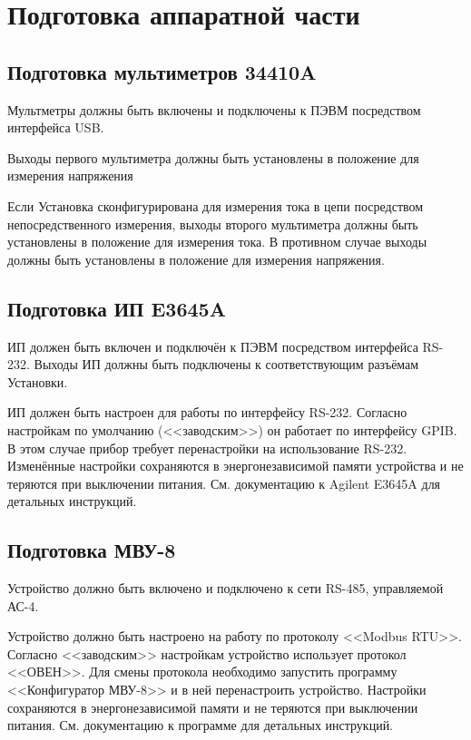\documentclass[12pt, a4paper, twocolumn]{report}
\begin{document}
\section{Подготовка аппаратной части}

\subsection{Подготовка мультиметров 34410A}

Мультметры должны быть включены и подключены к ПЭВМ посредством интерфейса USB.

Выходы первого мультиметра должны быть установлены в положение для измерения напряжения

Если Установка сконфигурирована для измерения тока в цепи посредством непосредственного измерения, выходы второго мультиметра должны быть установлены в положение для измерения тока. В противном случае выходы должны быть установлены в положение для измерения напряжения.

\subsection{Подготовка ИП E3645A}

ИП должен быть включен и подключён к ПЭВМ посредством интерфейса RS-232. Выходы ИП должны быть подключены к соответствующим разъёмам Установки.

ИП должен быть настроен для работы по интерфейсу RS-232. Согласно настройкам по умолчанию (<<заводским>>) он работает по интерфейсу GPIB. В этом случае прибор требует перенастройки на использование RS-232. Изменённые настройки сохраняются в энергонезависимой памяти устройства и не теряются при выключении питания. См. документацию к Agilent E3645A для детальных инструкций.

\subsection{Подготовка МВУ-8}

Устройство должно быть включено и подключено к сети RS-485, управляемой АС-4.

Устройство должно быть настроено на работу по протоколу <<Modbus RTU>>. Согласно <<заводским>> настройкам устройство использует протокол <<ОВЕН>>. Для смены протокола необходимо запустить программу <<Конфигуратор МВУ-8>> и в ней перенастроить устройство. Настройки сохраняются в энергонезависимой памяти и не теряются при выключении питания. См. документацию к программе для детальных инструкций.
\end{document}
